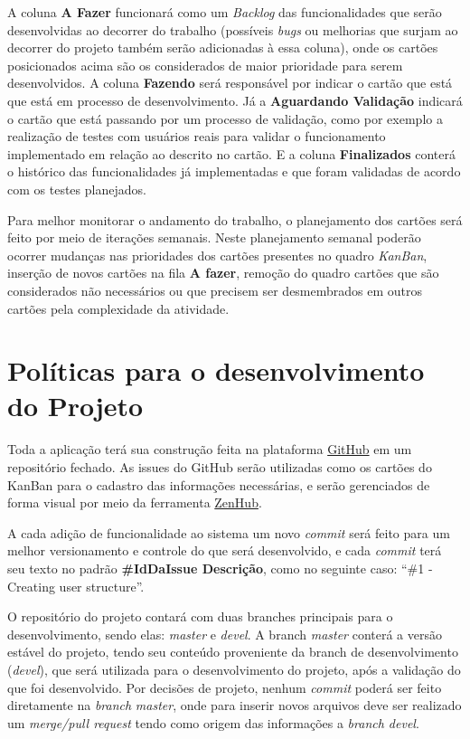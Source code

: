 A coluna \textbf{A Fazer} funcionará como um \textit{Backlog} das funcionalidades que serão desenvolvidas ao decorrer do trabalho (possíveis \textit{bugs} ou melhorias que surjam ao decorrer do projeto também serão adicionadas à essa coluna), onde os cartões posicionados acima são os considerados de maior prioridade para serem desenvolvidos. A coluna \textbf{Fazendo} será responsável por indicar o cartão que está que está em processo de desenvolvimento. Já a \textbf{Aguardando Validação} indicará o cartão que está passando por um processo de validação, como por exemplo a realização de testes com usuários reais para validar o funcionamento implementado em relação ao descrito no cartão. E a coluna \textbf{Finalizados} conterá o histórico das funcionalidades já implementadas e que foram validadas de acordo com os testes planejados.

Para melhor monitorar o andamento do trabalho, o planejamento dos cartões será feito por meio de iterações semanais. Neste planejamento semanal poderão ocorrer mudanças nas prioridades dos cartões presentes no quadro \textit{KanBan}, inserção de novos cartões na fila \textbf{A fazer}, remoção do quadro cartões que são considerados não necessários ou que precisem ser desmembrados em outros cartões pela complexidade da atividade. 

\section{Políticas para o desenvolvimento do Projeto}

Toda a aplicação terá sua construção feita na plataforma \href{https://github.com/}{GitHub}
em um repositório fechado. As issues do GitHub serão utilizadas como os cartões do KanBan para o cadastro das informações necessárias, e serão gerenciados de forma visual por meio da ferramenta \href{https://www.zenhub.com/}{ZenHub}.
 
A cada adição de funcionalidade ao sistema um novo \textit{commit} será feito para um melhor versionamento e controle do que será desenvolvido, e cada \textit{commit} terá seu texto no padrão \textbf{\#IdDaIssue Descrição}, como no seguinte caso:  “\#1 - Creating user structure”.

O repositório do projeto contará com duas branches principais para o desenvolvimento, sendo elas: \textit{master} e \textit{devel}. A branch \textit{master} conterá a versão estável do projeto, tendo seu conteúdo proveniente da branch de desenvolvimento (\textit{devel}), que será utilizada para o desenvolvimento do projeto, após a validação do que foi desenvolvido. Por decisões de projeto, nenhum \textit{commit} poderá ser feito diretamente na \textit{branch} \textit{master}, onde para inserir novos arquivos deve ser realizado um \textit{merge/pull request} tendo como origem das informações a \textit{branch devel}.



